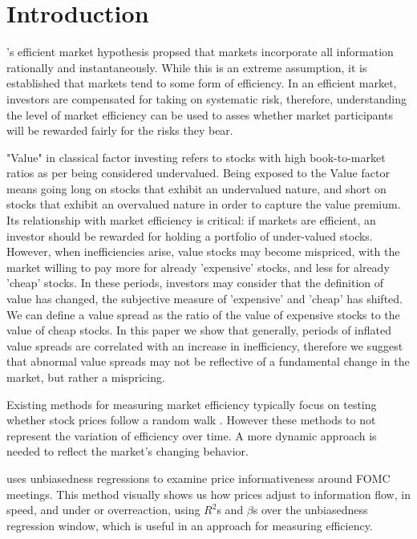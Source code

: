 \section{Introduction}
\indent \citet{fama_random_walk}'s efficient market hypothesis propsed that markets incorporate all information rationally and instantaneously. While 
this is an extreme assumption, it is established that markets tend to some form of efficiency. In an efficient market, investors are compensated for taking on systematic risk, therefore, understanding the level of 
market efficiency can be used to asses whether market participants will be rewarded fairly for the risks they bear.

"Value" in classical factor investing refers to stocks with high book-to-market ratios as per \citet{fama_french_1993} being considered undervalued. Being exposed to the Value factor means
going long on stocks that exhibit an undervalued nature, and short on stocks that exhibit an overvalued nature in order to capture the value premium. 
Its relationship with market efficiency is critical: if markets are efficient, an investor should be rewarded for holding a portfolio of under-valued stocks. 
However, when inefficiencies arise, value stocks may become mispriced, with the market willing to pay more for already 'expensive' stocks, and
less for already 'cheap' stocks. In these periods, investors may consider that the definition of value has changed, the subjective measure of 
'expensive' and 'cheap' has shifted. We can define a value spread as the ratio of the value of expensive stocks to the value of cheap stocks.
In this paper we show that generally, periods of inflated value spreads are correlated with an increase in inefficiency,
therefore we suggest that abnormal value spreads may not be reflective of a fundamental change in the market, but rather a mispricing.

Existing methods for measuring market efficiency typically focus on testing whether stock prices follow a random walk
\citep{fama_random_walk} \citep{lim_brooks_2010}. However these methods to not represent the variation of efficiency over time.
A more dynamic approach is needed to reflect the market’s changing behavior.

\citet{boguth_2023} uses unbiasedness regressions to examine price informativeness around FOMC meetings. 
This method visually shows us how prices adjust to information flow, in speed, and under or overreaction, using $R^2$s and $\beta$s over the unbiasedness regression window,
which is useful in an approach for measuring efficiency.

